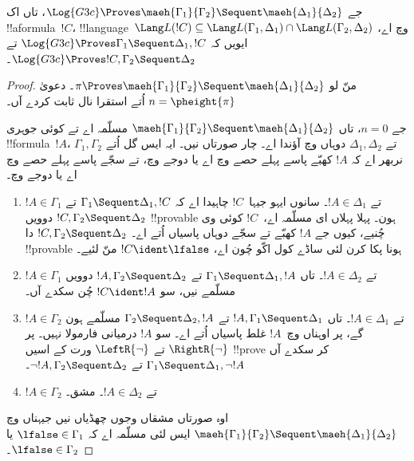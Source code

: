 \documentclass[../../../include/open-logic-section]{subfiles}
\begin{document}
\begin{lem}
جے $\Log{G3c}
\Proves \maeh{\Gamma_1}{\Gamma_2} \Sequent \maeh{\Delta_1}{\Delta_2}$، تاں اک !!a{formula}~$!C$، !!{language}~$\Lang L(!C)
\subseteq \Lang L(\Gamma_1,
\Delta_1) \cap \Lang L(\Gamma_2, \Delta_2)$ وچ اے، ایویں کہ $\Log{G3c}
\Proves \Gamma_1 \Sequent \Delta_1, !C$ تے $\Log{G3c} \Proves !C,
\Gamma_2 \Sequent \Delta_2$۔
\end{lem}

\begin{proof}
  منّ لو $\pi \Proves \maeh{\Gamma_1}{\Gamma_2} \Sequent
  \maeh{\Delta_1}{\Delta_2}$۔ دعویٰ $n=\pheight{\pi}$ اُتے استقرا نال ثابت کردے آں۔

جے $n=0$، تاں $\maeh{\Gamma_1}{\Gamma_2} \Sequent
  \maeh{\Delta_1}{\Delta_2}$ مسلّمہ اے تے کوئی جوہری !!{formula}~$!A$، $\Gamma_1, \Gamma_2$ تے $\Delta_1,
  \Delta_2$ دوہاں وچ آؤندا اے۔ چار صورتاں نیں۔ ایہ ایس گل اُتے نربھر اے کہ $!A$ کھبّے پاسے پہلے حصے وچ اے یا دوجے وچ، تے سجّے پاسے پہلے حصے وچ اے یا دوجے وچ۔
\begin{enumerate}
\item $!A \in \Gamma_1$ تے $!A \in \Delta_1$۔ سانوں ایہو جیہا~$!C$ چاہیدا اے کہ $\Gamma_1 \Sequent \Delta_1, !C$ تے $!C, \Gamma_2
    \Sequent \Delta_2$ دوویں !!{provable} ہون۔ پہلا پہلاں ای مسلّمہ اے،~$!C$ کوئی وی چُنیے، کیوں جے $!A$ کھبّے تے سجّے دوہاں پاسیاں اُتے اے۔ $!C, \Gamma_2
    \Sequent \Delta_2$ دا !!{provable} ہونا پکا کرن لئی ساڈے کول اکّو چُون اے، $!C \ident \lfalse$ منّ لئیے۔
\item $!A \in \Gamma_1$ تے $!A \in \Delta_2$۔ تاں $\Gamma_1
    \Sequent \Delta_1, !A$ تے $!A, \Gamma_2 \Sequent \Delta_2$ دوویں مسلّمے نیں، سو $!C \ident !A$ چُن سکدے آں۔
\item $!A \in \Gamma_2$ تے $!A \in \Delta_1$۔ تاں $!A, \Gamma_1
    \Sequent \Delta_1$ تے $\Gamma_2 \Sequent \Delta_2, !A$ مسلّمے ہون گے، پر اوہناں وچ~$!A$ غلط پاسیاں اُتے اے۔ سو $!A$ درمیانی فارمولا نہیں۔ پر $\RightR{\lnot}$ تے $\LeftR{\lnot}$ ورت کے اسیں !!{prove} کر سکدے آں $\Gamma_1
    \Sequent \Delta_1, \lnot!A$ تے $\lnot !A, \Gamma_2 \Sequent
    \Delta_2$۔
\item $!A \in \Gamma_2$ تے $!A \in \Delta_2$۔ مشق۔
\end{enumerate}
اوہ صورتاں مشقاں وجوں چھڈیاں نیں جیہناں وچ $\maeh{\Gamma_1}{\Gamma_2} \Sequent
  \maeh{\Delta_1}{\Delta_2}$ ایس لئی مسلّمہ اے کہ $\lfalse \in
  \Gamma_1$ یا $\lfalse \in \Gamma_2$۔


\end{proof}
\end{document}
